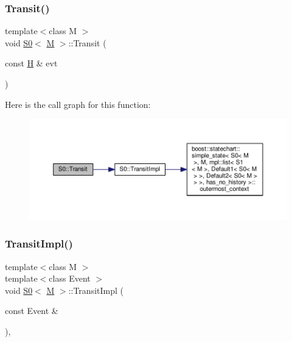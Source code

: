 \subsubsection{\texorpdfstring{Transit()}{Transit()}\hspace{0.1cm}{\footnotesize\ttfamily [7/7]}}
{\footnotesize\ttfamily template$<$class M $>$ \\
void \mbox{\hyperlink{struct_s0}{S0}}$<$ \mbox{\hyperlink{struct_m}{M}} $>$\+::Transit (\begin{DoxyParamCaption}\item[{const \mbox{\hyperlink{struct_h}{H}} \&}]{evt }\end{DoxyParamCaption})\hspace{0.3cm}{\ttfamily [inline]}}

Here is the call graph for this function\+:
\nopagebreak
\begin{figure}[H]
\begin{center}
\leavevmode
\includegraphics[width=350pt]{struct_s0_a50a83097d545d19abe3a1f51c21819d1_cgraph}
\end{center}
\end{figure}
\mbox{\label{struct_s0_a2668ab658c4d0e64fb9bf9881e4c72b6}} 
\subsubsection{\texorpdfstring{Transit\+Impl()}{TransitImpl()}}
{\footnotesize\ttfamily template$<$class M $>$ \\
template$<$class Event $>$ \\
void \mbox{\hyperlink{struct_s0}{S0}}$<$ \mbox{\hyperlink{struct_m}{M}} $>$\+::Transit\+Impl (\begin{DoxyParamCaption}\item[{const Event \&}]{ }\end{DoxyParamCaption})\hspace{0.3cm}{\ttfamily [inline]}, {\ttfamily [private]}}

